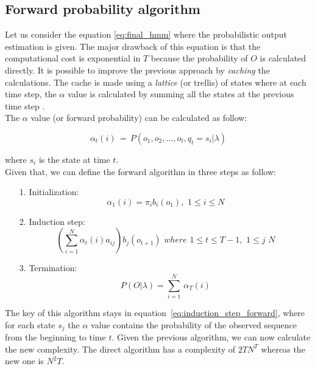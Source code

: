 \subsection{Forward probability algorithm}
Let us consider the equation \ref{eq:final_hmm} where the probabilistic output estimation is given. The major drawback of this equation is that the computational cost is exponential in $T$ because the probability of $O$ is calculated directly. It is possible to improve the previous approach by \textit{caching} the calculations. The cache is made using a \textit{lattice} (or trellis) of states where at each time step, the $\alpha$ value is calculated by summing all the states at the previous time step \cite{hmm_tutorial}. \\

\noindent The $\alpha$ value (or forward probability) can be calculated as follow:

\begin{equation}
\label{eq:alpha_equation}
	\alpha_{t}(i) \, = \, P(o_{1}, o_{2}, ... , o_{t}, q_{t} = s_{i} | \lambda)
\end{equation}

\noindent where $s_{i}$ is the state at time $t$. \\
Given that, we can define the forward algorithm in three steps as follow:

\begin{itemize}
	\item[1.]{Initialization:} \\
		\begin{equation}
			\alpha_{1}(i) = \pi_{i}b_{i}(o_{1}), \,\, 1 \leq i \leq N
		\end{equation}
	\item[2.]{Induction step:} \\
		\begin{equation}
		\label{eq:induction_step_forward}
			\left ( \sum_{i=1}^{N} \alpha_{t}(i) a_{ij} \right ) b_{j}(o_{t+1}) \,\, where \,\, 1 \leq t \leq T - 1, \,\, 1 \leq j \,\, N
		\end{equation}
	\item[3.]{Termination:} \\
		\begin{equation}
			P(O|\lambda) = \sum_{i=1}^{N} \, \alpha_{T}(i)
		\end{equation}
\end{itemize}

\noindent The key of this algorithm stays in equation~\ref{eq:induction_step_forward}, where for each state $s_{j}$ the $\alpha$ value contains the probability of the observed sequence from the beginning to time $t$. Given the previous algorithm, we can now calculate the new complexity. The direct algorithm has a complexity of $2TN^{T}$ whereas the new one is $N^{2}T$.

